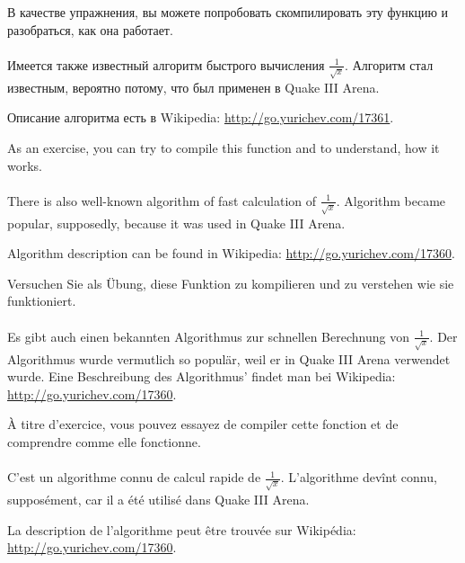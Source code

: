 \ifdefined\RUSSIAN
В качестве упражнения, вы можете попробовать скомпилировать эту функцию и разобраться, как она работает. \\
\\
Имеется также известный алгоритм быстрого вычисления $\frac{1}{\sqrt{x}}$.
Алгоритм стал известным, вероятно потому, что был применен в Quake III Arena.

Описание алгоритма есть в Wikipedia: \url{http://go.yurichev.com/17361}.
\fi %

\ifdefined\ENGLISH
As an exercise, you can try to compile this function and to understand, how it works. \\
\\
There is also well-known algorithm of fast calculation of $\frac{1}{\sqrt{x}}$.
Algorithm became popular, supposedly, because it was used in Quake III Arena.

Algorithm description can be found in Wikipedia: \url{http://go.yurichev.com/17360}.
\fi %

\ifdefined\GERMAN
Versuchen Sie als Übung, diese Funktion zu kompilieren und zu verstehen wie sie funktioniert.\\\\
Es gibt auch einen bekannten Algorithmus zur schnellen Berechnung von $\frac{1}{\sqrt{x}}$.
Der Algorithmus wurde vermutlich so populär, weil er in Quake III Arena verwendet wurde.
Eine Beschreibung des Algorithmus' findet man bei Wikipedia: \url{http://go.yurichev.com/17360}.
\fi %

\ifdefined\FRENCH
À titre d'exercice, vous pouvez essayez de compiler cette fonction et de comprendre
comme elle fonctionne.\\
\\
C'est un algorithme connu de calcul rapide de $\frac{1}{\sqrt{x}}$.
L'algorithme devînt connu, supposément, car il a été utilisé dans Quake III Arena.

La description de l'algorithme peut être trouvée sur Wikipédia: \url{http://go.yurichev.com/17360}.
\fi %


